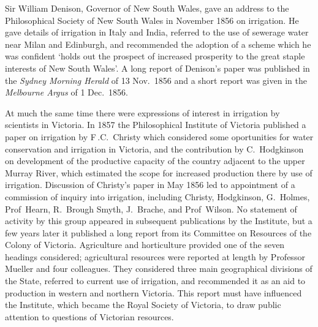 Sir William Denison, Governor of New South Wales,
 gave an address to
the Philosophical Society of New South Wales in November 1856 on
irrigation.  He gave details of irrigation in Italy and India,
referred to the use of sewerage water near Milan and Edinburgh, and
recommended the adoption of a scheme which he was confident `holds out
the prospect of increased prosperity to the great staple interests of
New South Wales'.  A long report of Denison's paper was published in
the \emph{Sydney Morning Herald} of 13 Nov.\ 1856 and a short report
was given in the \emph{Melbourne Argus} of 1 Dec.\ 1856. 

At much the same time there were expressions of interest in irrigation
by scientists in Victoria.  In 1857 the Philosophical Institute of
Victoria published a paper on irrigation by F\,.C.~Christy
 which considered some oportunities for water
conservation and irrigation in Victoria, and the contribution by
C.~Hodgkinson   on development of the productive
capacity of the country adjacent to the upper Murray River, which
estimated the scope for increased production there by use of
irrigation.  Discussion of Christy's paper in May 1856 led to
appointment of a commission of inquiry into irrigation, including
Christy, Hodgkinson, G.~Holmes,  Prof~Hearn,
 R.~Brough Smyth,  J.~Brache,
 and Prof~Wilson.  No statement
of activity by this group appeared in subsequent publications by the
Institute, but a few years later it published a long report from its
Committee on Resources of the Colony of Victoria.  Agriculture and
horticulture provided one of the seven headings considered;
agricultural resources were reported at length by Professor Mueller
 and four colleagues.  They considered three main
geographical divisions of the State, referred to current use of
irrigation, and recommended it as an aid to production in western and
northern Victoria.  This report must have influenced the Institute,
which became the Royal Society of Victoria,
 to draw
public attention to questions of Victorian
resources.

